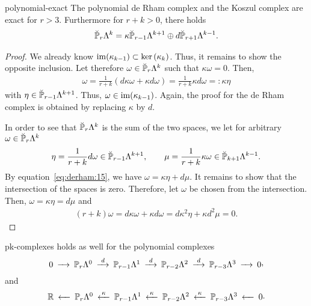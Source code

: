 \begin{Theorem}{polynomial-exact}
  The polynomial de Rham complex and the Koszul complex are exact for
  $r>3$. Furthermore for $r+k>0$, there holds
  \begin{gather}
    \label{eq:derham:17}
    \breve \P_r\Lambda^k = \kappa \breve\P_{r-1}\Lambda^{k+1}
    \oplus d\breve\P_{r+1}\Lambda^{k-1}.
  \end{gather}
\end{Theorem}

\begin{proof}
  We already know $\range{\kappa_{k-1}} \subset \ker{\kappa_k}$. Thus,
  it remains to show the opposite inclusion. Let therefore $\omega\in
  \breve \P_r\Lambda^k$ such that $\kappa\omega=0$. Then,
  \begin{gather}
    \omega = \frac1{r+k} (d\kappa\omega+\kappa d\omega)
    = \frac1{r+k} \kappa d\omega =: \kappa\eta
  \end{gather}
  with $\eta \in \breve\P_{r-1}\Lambda^{k+1}$. Thus,
  $\omega\in \range{\kappa_{k-1}}$. Again, the proof for the de Rham
  complex is obtained by replacing $\kappa$ by $d$.

  In order to see that $\breve \P_r\Lambda^k$ is the sum of the two
  spaces, we let for arbitrary $\omega\in \breve \P_r\Lambda^k$
  \begin{gather}
    \eta = \frac1{r+k} d\omega \in \breve\P_{r-1}\Lambda^{k+1},
    \qquad
    \mu = \frac1{r+k} \kappa\omega \in \breve\P_{k+1}\Lambda^{k-1}.
  \end{gather}
  By equation~\eqref{eq:derham:15}, we have
  $\omega = \kappa\eta + d\mu$. It remains to show that the
  intersection of the spaces is zero. Therefore, let $\omega$ be
  chosen from the intersection. Then, $\omega = \kappa\eta = d \mu$
  and
  \begin{gather}
    (r+k)\omega = d\kappa \omega + \kappa d \omega
    = d \kappa^2 \eta + \kappa d^2 \mu = 0.
  \end{gather}
\end{proof}

\begin{Corollary}{pk-complexes}
   holds as well for the
  polynomial complexes
  \begin{gather}\minCDarrowwidth15pt
    \begin{CD}
      0
      @>>> \P_r\Lambda^0
      @>{d}>> \P_{r-1}\Lambda^1
      @>{d}>> \P_{r-2}\Lambda^2
      @>{d}>> \P_{r-3}\Lambda^3
      @>>> 0
    \end{CD},
  \end{gather}
  and
  \begin{gather}\minCDarrowwidth15pt
    \begin{CD}
      \R
      @<<< \P_r\Lambda^0
      @<{\kappa}<< \P_{r-1}\Lambda^1
      @<{\kappa}<< \P_{r-2}\Lambda^2
      @<{\kappa}<< \P_{r-3}\Lambda^3
      @<<< 0
    \end{CD}.
  \end{gather}
\end{Corollary}

